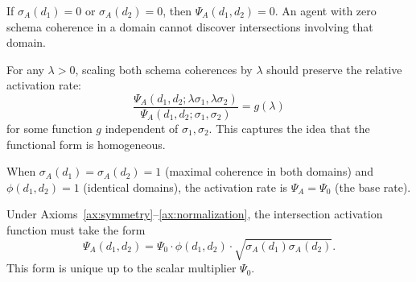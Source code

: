 \begin{axiom}
\label{ax:zero-coherence}
\leavevmode\newline
If $\sigma_A(d_1)=0$ or $\sigma_A(d_2)=0$, then
$\Psi_A(d_1,d_2)=0$. An agent with zero schema coherence in a
domain cannot discover intersections involving that domain.
\end{axiom}

\begin{axiom}
\label{ax:scale-invariance}
For any $\lambda > 0$, scaling both schema coherences by
$\lambda$ should preserve the relative activation rate:
\[
\frac{\Psi_A(d_1, d_2; \lambda \sigma_1, \lambda \sigma_2)}
{\Psi_A(d_1, d_2; \sigma_1, \sigma_2)}
= g(\lambda)
\]
for some function $g$ independent of $\sigma_1, \sigma_2$. This
captures the idea that the functional form is homogeneous.
\end{axiom}

\begin{axiom}[Normalization]
\label{ax:normalization}
When $\sigma_A(d_1) = \sigma_A(d_2) = 1$ (maximal coherence in both
domains) and $\phi(d_1, d_2) = 1$ (identical domains), the activation
rate is $\Psi_A = \Psi_0$ (the base rate).
\end{axiom}

\begin{theorem}
\label{thm:psi-unique}
Under Axioms~\ref{ax:symmetry}--\ref{ax:normalization}, the intersection
activation function must take the form
\[
\Psi_A(d_1, d_2) = \Psi_0 \cdot \phi(d_1, d_2) \cdot
\sqrt{\sigma_A(d_1) \sigma_A(d_2)}.
\]
This form is unique up to the scalar multiplier $\Psi_0$.
\end{theorem}


